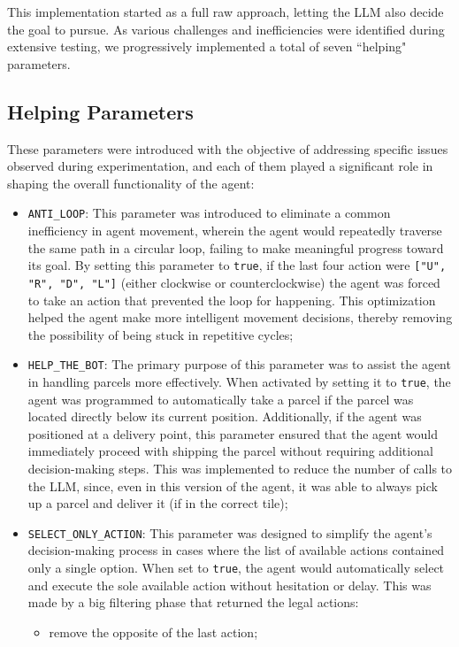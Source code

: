 This implementation started as a full raw approach, letting the LLM also decide the
goal to pursue. As various challenges and inefficiencies were identified during
extensive testing, we progressively implemented a total of seven ``helping"
parameters.

\subsection{Helping Parameters}
These parameters were introduced with the objective of addressing specific
issues observed during experimentation, and each of them played a significant role
in shaping the overall functionality of the agent:
\begin{itemize}
  \item \texttt{ANTI\_LOOP}: This parameter was introduced to eliminate a common
    inefficiency in agent movement, wherein the agent would repeatedly traverse
    the same path in a circular loop, failing to make meaningful progress toward
    its goal. By setting this parameter to \texttt{true}, if the last four
    action were \texttt{["U", "R", "D", "L"]} (either clockwise or
    counterclockwise) the agent was forced to take an action that prevented the loop
    for happening. This optimization helped the agent make more intelligent
    movement decisions, thereby removing the possibility of being stuck in repetitive
    cycles;

  \item \texttt{HELP\_THE\_BOT}: The primary purpose of this parameter was to assist
    the agent in handling parcels more effectively. When activated by setting it
    to \texttt{true}, the agent was programmed to automatically take a parcel if
    the parcel was located directly below its current position. Additionally, if
    the agent was positioned at a delivery point, this parameter ensured that the
    agent would immediately proceed with shipping the parcel without requiring additional
    decision-making steps. This was implemented to reduce the number of calls to
    the LLM, since, even in this version of the agent, it was able to always pick
    up a parcel and deliver it (if in the correct tile);

  \item \texttt{SELECT\_ONLY\_ACTION}: This parameter was designed to simplify the
    agent's decision-making process in cases where the list of available actions
    contained only a single option. When set to \texttt{true}, the agent would
    automatically select and execute the sole available action without
    hesitation or delay. This was made by a big filtering phase that returned the
    legal actions:
    \begin{itemize}
      \item remove the opposite of the last action;


\end{itemize}
\end{itemize}
